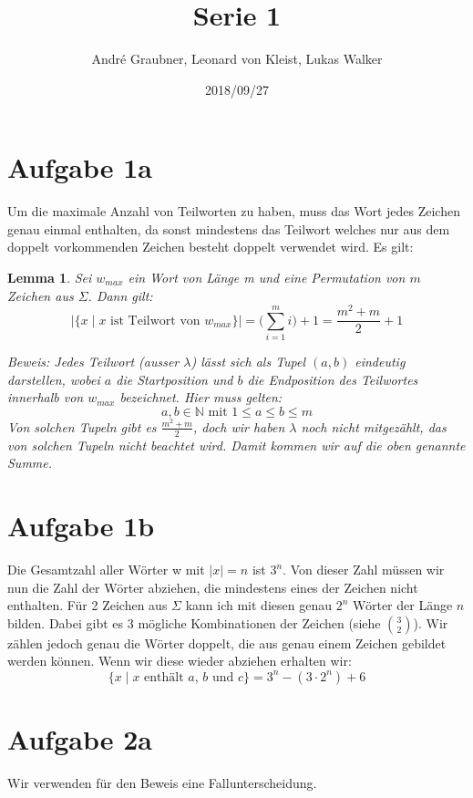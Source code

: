 \documentclass[a4paper]{article}
\title{Serie 1}
\author{André Graubner, Leonard von Kleist, Lukas Walker}
\date{2018/09/27}
\newtheorem{lemma}{Lemma}
\begin{document}
 

\maketitle

\section{Aufgabe 1a}
	Um die maximale Anzahl von Teilworten zu haben,
	muss das Wort jedes Zeichen genau einmal enthalten, 
	da sonst mindestens das Teilwort welches nur aus 
	dem doppelt vorkommenden Zeichen besteht doppelt 
	verwendet wird. Es gilt:

	\begin{lemma}
		Sei $w_{max}$ ein Wort von Länge m und eine Permutation von $m$ Zeichen aus $\Sigma$. Dann gilt:
		\[\Bigg\lvert \Big\{x \mid x \text{ ist Teilwort von } w_{max} \Big\} \Bigg\lvert = 
		\bigg(\sum_{i=1}^{m} i\bigg) + 1 = \frac{m^2 + m}{2} + 1 \]

		Beweis:
		Jedes Teilwort (ausser $\lambda$) lässt sich als Tupel $(a,b)$ eindeutig darstellen,
		wobei $a$ die Startposition und $b$ die Endposition des Teilwortes
		innerhalb von $w_{max}$ bezeichnet. Hier muss gelten:
		\[a, b \in \mathbb{N} \text{ mit } 1 \leq a \leq b \leq m\]
		Von solchen Tupeln gibt es $\frac{m^2 + m}{2}$, doch wir haben $\lambda$
		noch nicht mitgezählt, das von solchen Tupeln nicht beachtet wird.
		Damit kommen wir auf die oben genannte Summe.
	\end{lemma}

\section{Aufgabe 1b}
	Die Gesamtzahl aller Wörter w mit $\lvert x \rvert = n$ ist $3^n$.
	Von dieser Zahl müssen wir nun die Zahl der Wörter abziehen, die
	mindestens eines der Zeichen nicht enthalten. Für 2 Zeichen aus 
	$\Sigma$ kann ich mit diesen genau $2^n$ Wörter der Länge $n$ bilden.
	Dabei gibt es 3 mögliche Kombinationen der Zeichen (siehe $\binom{3}{2}$).
	Wir zählen jedoch genau die Wörter doppelt, die aus genau einem
	Zeichen gebildet werden können. Wenn wir diese wieder abziehen erhalten wir:
	\[\big\{x \mid \text{$x$ enthält $a$, $b$ und $c$} \big\} = 3^n - (3 \cdot 2^n) + 6\]

\section{Aufgabe 2a}
	Wir verwenden für den Beweis eine Fallunterscheidung.
\end{document}
